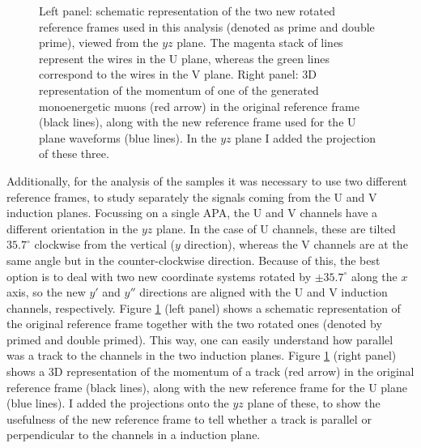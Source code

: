 \begin{figure}[t]
\begin{subfigure}{0.5\textwidth}
	\end{subfigure}
	\caption[Schematic representation of the two rotated reference frames used in the analysis of the MC filter performance.]{Left panel: schematic representation of the two new rotated reference frames used in this analysis (denoted as prime and double prime), viewed from the $yz$ plane. The magenta stack of lines represent the wires in the U plane, whereas the green lines correspond to the wires in the V plane. Right panel: 3D representation of the momentum of one of the generated monoenergetic muons (red arrow) in the original reference frame (black lines), along with the new reference frame used for the U plane waveforms (blue lines). In the $yz$ plane I added the projection of these three.}
	\label{fig:reference_frame}
\end{figure}

Additionally, for the analysis of the samples it was necessary to use two different reference frames, to study separately the signals coming from the U and V induction planes. Focussing on a single APA, the U and V channels have a different orientation in the $yz$ plane. In the case of U channels, these are tilted $35.7^{\circ}$ clockwise from the vertical ($y$ direction), whereas the V channels are at the same angle but in the counter-clockwise direction. Because of this, the best option is to deal with two new coordinate systems rotated by $\pm 35.7^{\circ}$ along the $x$ axis, so the new $y'$ and $y''$ directions are aligned with the U and V induction channels, respectively. Figure \ref{fig:reference_frame} (left panel) shows a schematic representation of the original reference frame together with the two rotated ones (denoted by primed and double primed). This way, one can easily understand how parallel was a track to the channels in the two induction planes. Figure \ref{fig:reference_frame} (right panel) shows a 3D representation of the momentum of a track (red arrow) in the original reference frame (black lines), along with the new reference frame for the U plane (blue lines). I added the projections onto the $yz$ plane of these, to show the usefulness of the new reference frame to tell whether a track is parallel or perpendicular to the channels in a induction plane.

